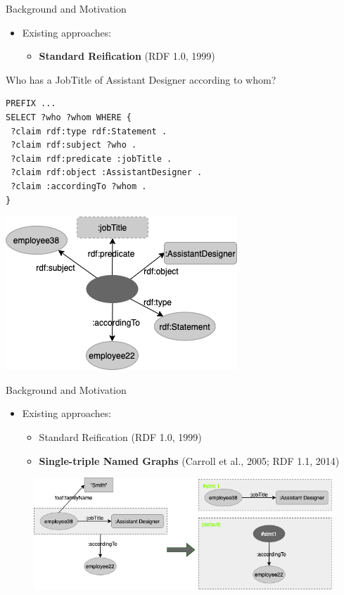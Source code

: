 \documentclass[aspectratio=169]{beamer}
\begin{document}
\begin{frame}[fragile]{Background and Motivation}
    \begin{itemize}
        \item Existing approaches:
            \begin{itemize}
                \item \textbf{Standard Reification} (RDF 1.0, 1999)
            \end{itemize}
    \end{itemize}
    \begin{minipage}{0.56\textwidth}
    \small{Who has a JobTitle of Assistant Designer according to whom?}
\begin{lstlisting}[language=SPARQL]
PREFIX ...
SELECT ?who ?whom WHERE {
 ?claim rdf:type rdf:Statement .
 ?claim rdf:subject ?who .
 ?claim rdf:predicate :jobTitle .
 ?claim rdf:object :AssistantDesigner .
 ?claim :accordingTo ?whom .
}
\end{lstlisting}
\end{minipage}
\begin{minipage}{0.43\textwidth}
\centering
	\includegraphics[scale=0.5]{images/Example-2-Reification.png}
\end{minipage}
\end{frame}

\begin{frame}{Background and Motivation}
    \begin{itemize}
        \item Existing approaches:
            \begin{itemize}
                \item Standard Reification (RDF 1.0, 1999)
                \item \textbf{Single-triple Named Graphs} (Carroll et al., 2005; RDF 1.1, 2014)
            \end{itemize}
    \end{itemize}
    \begin{figure}
        \centering
        \includegraphics[scale=0.6]{images/Example-2-To-NamedGraph.png}
    \end{figure}
\end{frame}
\end{document}

